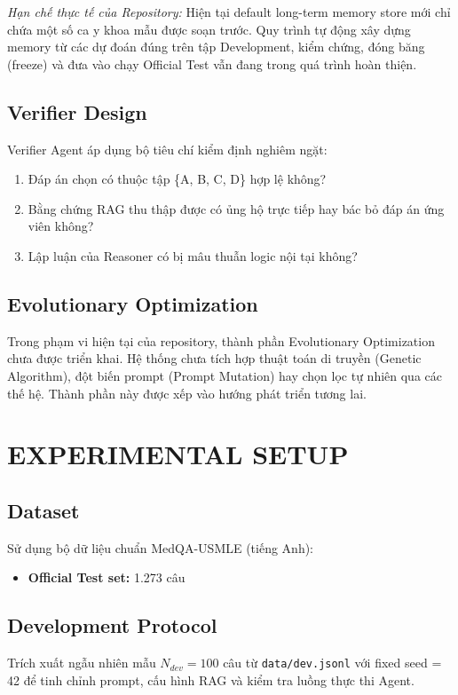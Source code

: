 \textit{Hạn chế thực tế của Repository:} Hiện tại default long-term memory store mới chỉ chứa một số ca y khoa mẫu được soạn trước. Quy trình tự động xây dựng memory từ các dự đoán đúng trên tập Development, kiểm chứng, đóng băng (freeze) và đưa vào chạy Official Test vẫn đang trong quá trình hoàn thiện.

\subsection{Verifier Design}
Verifier Agent áp dụng bộ tiêu chí kiểm định nghiêm ngặt:
\begin{enumerate}
    \item Đáp án chọn có thuộc tập \{A, B, C, D\} hợp lệ không?
    \item Bằng chứng RAG thu thập được có ủng hộ trực tiếp hay bác bỏ đáp án ứng viên không?
    \item Lập luận của Reasoner có bị mâu thuẫn logic nội tại không?
\end{enumerate}

\subsection{Evolutionary Optimization}
Trong phạm vi hiện tại của repository, thành phần Evolutionary Optimization chưa được triển khai. Hệ thống chưa tích hợp thuật toán di truyền (Genetic Algorithm), đột biến prompt (Prompt Mutation) hay chọn lọc tự nhiên qua các thế hệ. Thành phần này được xếp vào hướng phát triển tương lai.

\section{EXPERIMENTAL SETUP}

\subsection{Dataset}
Sử dụng bộ dữ liệu chuẩn MedQA-USMLE (tiếng Anh):
\begin{itemize}
    \item \textbf{Official Test set:} 1.273 câu
\end{itemize}

\subsection{Development Protocol}
Trích xuất ngẫu nhiên mẫu $N_{dev} = 100$ câu từ \texttt{data/dev.jsonl} với fixed seed = 42 để tinh chỉnh prompt, cấu hình RAG và kiểm tra luồng thực thi Agent.

